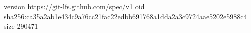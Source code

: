version https://git-lfs.github.com/spec/v1
oid sha256:ca35a2ab1e434c9a76cc21fac22edbb691768a1dda2a3c9724aae5202e5988c4
size 290471
